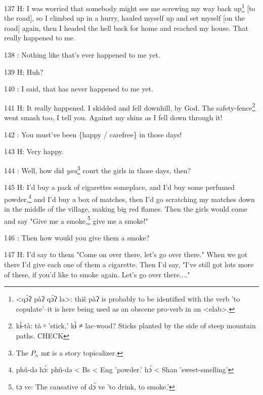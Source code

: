 137 H: I was worried that somebody might see me screwing my way back up\footnote{<qɔ̀ʔ pàʔ qɔ̀ʔ la>: thiš pàʔ is probably to be identified with the verb 'to copulate'--it is here being used as an obscene pro-verb in an <elab>.} [to
the road], so I climbed up in a hurry, hauled myself up and set myself [on the
road] again, then I headed the hell back for home and reached my house. That really
happened to me.

138  : Nothing like that's ever happened to me yet.

139 H; Huh?

140  : I said, that has never happened to me yet.

141 H: It really happened. I skidded and fell downhill, by God. The safety-fence\footnote{kɨ̀-tà: tà ꞊ 'stick,' kɨ̀ ≠ lac-wood? Sticks planted by the side of steep mountain paths. CHECK}
went smash too, I tell you. Against my shins as I fell down through it!

142  : You must've been \{happy / carefree\} in those days!

143 H: Very happy.

144  : Well, how did \textit{you}\footnote{The $P_n$ mɛ is a story topicalizer.} court the girls in those days, then?

145 H: I'd buy a pack of cigarettes someplace, and I'd buy some perfumed powder,\footnote{phû-də hɔ́: phû-də < Bs < Eng 'powder.' hɔ́ < Shan 'sweet-smelling'}
and I'd buy a box of matches, then I'd go scratching my matches down in the middle
of the village, making big red flames. Then the girls would come and say "Give
me a smoke,\footnote{tɔ ve: The causative of dɔ̀ ve 'to drink, to smoke.'} give me a smoke!"

146  : Then how would you give them a smoke?

147 H: I'd say to them "Come on over there, let's go over there."
When we got there I'd give each one of them a cigarette. Then I'd say, "I've
still got lots more of these, if you'd like to smoke again. Let's go over there...."

